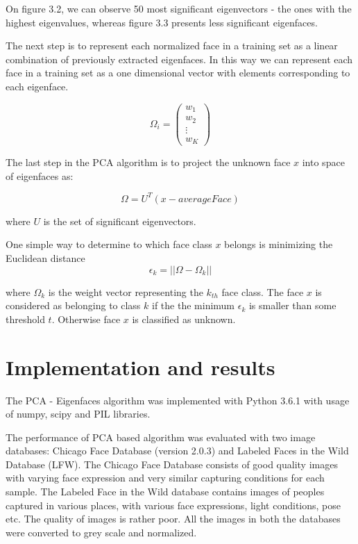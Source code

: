 On figure 3.2, we can observe 50 most significant eigenvectors - the ones with the highest eigenvalues, whereas figure 3.3 presents less significant eigenfaces. 

The next step is to represent each normalized face in a training set as a linear combination of previously extracted eigenfaces. In this way we can represent each face in a training set as a one dimensional vector with elements corresponding to each eigenface. 

\begin{equation}
\Omega_{i} =  \begin{pmatrix}
 w_{1} \\
 w_{2} \\
  \vdots  \\
 w_{K} 
 \end{pmatrix}
\end{equation}
 
The last step in the PCA algorithm is to project the unknown face  $x$ into space of eigenfaces as:

\begin{equation}
\Omega = U^{T} (x - averageFace) 
\end{equation}

where $U$ is the set of significant eigenvectors.

One simple way to determine to which face class $x$ belongs is minimizing the Euclidean distance 
\begin{equation}
\epsilon_{k} = ||\Omega - \Omega_{k}||
\end{equation}

where $\Omega_{k}$ is the weight vector representing the $k_{th}$ face class. The face $x$ is considered as belonging to class $k$ if the the minimum $\epsilon_{k}$ is smaller than some threshold $t$. Otherwise face $x$ is classified as unknown.

\section{Implementation and results}

The PCA - Eigenfaces algorithm was implemented with Python 3.6.1 with usage of numpy, scipy and PIL libraries. 

The performance of PCA based algorithm was evaluated with two image databases: Chicago Face Database (version 2.0.3) and Labeled Faces in the Wild Database (LFW).  The Chicago Face Database consists of good quality images with varying face expression and very similar capturing conditions for each sample. The Labeled Face in the Wild database contains images of peoples captured in various places, with various face expressions, light conditions, pose etc. The quality of images is rather poor. All the images in both the databases were converted to grey scale and normalized.


